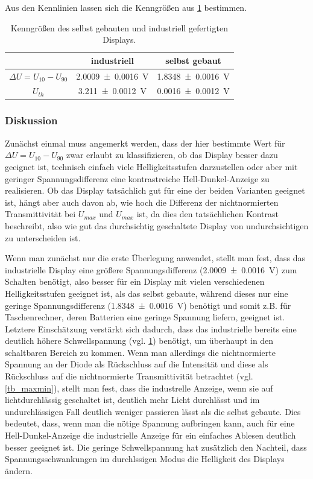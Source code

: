 \documentclass[
	a4paper,
	12pt,
	pagesize,
	ngerman
]{scrartcl}
\begin{document}
	Aus den Kennlinien lassen sich die Kenngrößen aus \cref{tb_kenngroessen} bestimmen.
	\begin{table}[H]
		\centering
		\begin{tabular}{ c | c | c }
			 & industriell & selbst gebaut \\ \hline
			$\Delta U=U_{10}-U_{90}$&\SI{2.0009+-0.0016}{V}&\SI{1.8348+-0.0016}{V} \\
			$U_{th}$ & \SI{3.211+-0.0012}{V} & \SI{0.0016+-0.0012}{V} \\
			\hline
		\end{tabular}
		\caption{Kenngrößen des selbst gebauten und industriell gefertigten Displays.}
		\label{tb_kenngroessen}
\end{table}

	\subsubsection{Diskussion}
	Zunächst einmal muss angemerkt werden, dass der hier bestimmte Wert für $\Delta U=U_{10}-U_{90}$ zwar erlaubt zu klassifizieren, ob das Display besser dazu geeignet ist, technisch einfach viele Helligkeitsstufen darzustellen oder aber mit geringer Spannungsdifferenz eine kontrastreiche Hell-Dunkel-Anzeige zu realisieren.
	Ob das Display tatsächlich gut für eine der beiden Varianten geeignet ist, hängt aber auch davon ab, wie hoch die Differenz der nichtnormierten Transmittivität bei $U_{max}$ und $U_{max}$ ist, da dies den tatsächlichen Kontrast beschreibt, also wie gut das durchsichtig geschaltete Display von undurchsichtigen zu unterscheiden ist.

	Wenn man zunächst nur die erste Überlegung anwendet, stellt man fest, dass das industrielle Display eine größere Spannungsdifferenz (\SI{2.0009+-0.0016}{V}) zum Schalten benötigt, also besser für ein Display mit vielen verschiedenen Helligkeitsstufen geeignet ist, als das selbst gebaute, während dieses nur eine geringe Spannungsdifferenz (\SI{1.8348+-0.0016}{V}) benötigt und somit z.B. für Taschenrechner, deren Batterien eine geringe Spannung liefern, geeignet ist.
	Letztere Einschätzung verstärkt sich dadurch, dass das industrielle bereits eine deutlich höhere Schwellspannung (vgl. \cref{tb_kenngroessen}) benötigt, um überhaupt in den schaltbaren Bereich zu kommen.
	Wenn man allerdings die nichtnormierte Spannung an der Diode als Rückschluss auf die Intensität und diese als Rückschluss auf die nichtnormierte Transmittivität betrachtet (vgl. \cref{tb_maxmin}), stellt man fest, dass die industrelle Anzeige, wenn sie auf lichtdurchlässig geschaltet ist, deutlich mehr Licht durchlässt und im undurchlässigen Fall deutlich weniger passieren lässt als die selbst gebaute.
	Dies bedeutet, dass, wenn man die nötige Spannung aufbringen kann, auch für eine Hell-Dunkel-Anzeige die industrielle Anzeige für ein einfaches Ablesen deutlich besser geeignet ist.
	Die geringe Schwellspannung hat zusätzlich den Nachteil, dass  Spannungsschwankungen im durchlssigen Modus die Helligkeit des Displays ändern.
\end{document}
